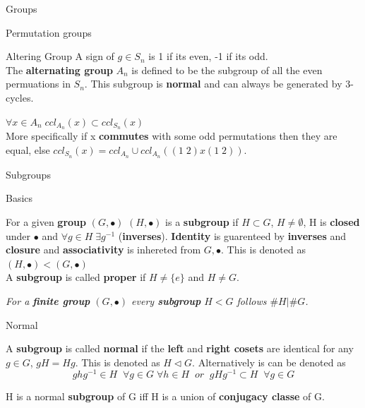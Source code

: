 \documentclass[12pt, letterpaper]{article}
\begin{document}
\begin{section}{Groups}
\begin{subsection}{Permutation groups}
\begin{subsubsection}{Altering Group}
      A sign of \(g \in S_{n}\) is 1 if its even, -1 if its odd. \\
      The \textbf{alternating group} \(A_{n}\) is defined to be the subgroup of
      all the even permuations in \(S_{n}\). This subgroup is \textbf{normal} and
      can always be generated by 3-cycles.

      \emph{\(\forall x \in A_{n} \; ccl_{A_{n}}(x) \subset ccl_{S_{n}}(x)\)} \\
      More specifically if x \textbf{commutes} with some odd permutations then
      they are equal, else
      \(ccl_{S_{n}}(x) = ccl_{A_{n}} \cup ccl_{A_{n}}((1 \; 2) x (1 \; 2))\).

    \end{subsubsection}

  \end{subsection}

  \begin{subsection}{Subgroups}

    \begin{subsubsection}{Basics}

      For a given \textbf{group} \((G, \bullet)\) \((H, \bullet)\) is a \textbf{subgroup}
      if \(H \subset G\), \(H \neq \emptyset\), H is \textbf{closed} under \(\bullet\)
      and \(\forall g \in H \; \exists g^{-1}\) (\textbf{inverses}). \textbf{Identity}
      is guarenteed by \textbf{inverses} and \textbf{closure} and \textbf{associativity}
      is inhereted from \(G, \bullet\). This is denoted as \((H, \bullet) < (G, \bullet)\) \\
      A \textbf{subgroup} is called \textbf{proper} if \(H \neq \{{} e \}{}\) and
      \(H \neq G\).

      \emph{For a \textbf{finite group} \((G, \bullet)\) every \textbf{subgroup}
        \(H < G\) follows \(\#H|\#G\).}

    \end{subsubsection}

    \begin{subsubsection}{Normal}

      A \textbf{subgroup} is called \textbf{normal} if the \textbf{left} and
      \textbf{right cosets} are identical for any \(g \in G\), \(gH = Hg\).
      This is denoted as \(H \triangleleft G\). Alternatively is can be denoted as
      \[ghg^{-1} \in H \;\; \forall g \in G \; \forall h \in H \;\;
        or \;\; gHg^{-1} \subset H \;\; \forall g \in G\]

      H is a normal \textbf{subgroup} of G iff H is a union of \textbf{conjugacy classe}
      of G.


\end{subsubsection}
\end{subsection}
\end{section}
\end{document}
